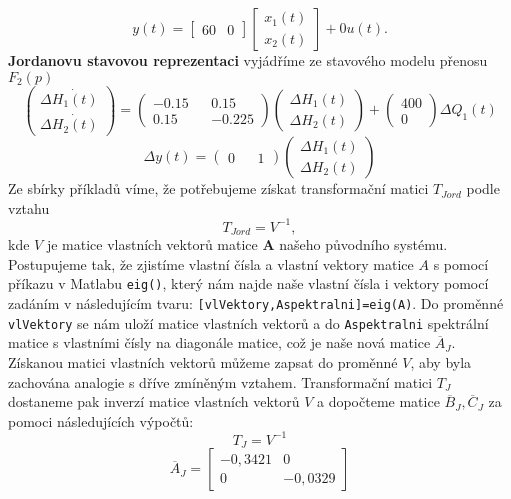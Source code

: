 \documentclass{article}
\begin{document}
				\[y(t)=\begin{bmatrix}
					60&0
				\end{bmatrix}
				\begin{bmatrix}
					x_{1}(t)\\
					x_{2}(t)
				\end{bmatrix}+0u(t).\]
			\textbf{Jordanovu stavovou reprezentaci} vyjádříme ze stavového modelu přenosu \(F_{2}(p)\)
				\[\begin{pmatrix}
					\Delta \dot{H_1(t)}\\
					\Delta \dot{H_2(t)}
				\end{pmatrix}=\begin{pmatrix}
					-0.15 && 0.15\\
					0.15&& -0.225
				\end{pmatrix}\begin{pmatrix}
					\Delta H_1(t)\\
					\Delta H_2(t)
				\end{pmatrix}+\begin{pmatrix}
					400\\
					0
				\end{pmatrix}\Delta Q_1(t)\]
				\[\Delta y(t)=\begin{pmatrix}
					0 && 1
				\end{pmatrix}\begin{pmatrix}
					\Delta H_1(t)\\
					\Delta H_2(t)
				\end{pmatrix}\]
			Ze sbírky příkladů víme, že potřebujeme získat transformační matici \(T_{Jord}\) podle vztahu 
				\[T_{Jord}=V^{-1},\]
			kde \(V\) je matice vlastních vektorů matice \(\textbf{A}\) našeho původního systému.
			Postupujeme tak, že zjistíme vlastní čísla a vlastní vektory matice \(A\) s pomocí příkazu v Matlabu \verb*|eig()|, který nám najde naše vlastní čísla i vektory pomocí zadáním v následujícím tvaru: \verb*|[vlVektory,Aspektralni]=eig(A)|. Do proměnné \verb*|vlVektory| se nám uloží matice vlastních vektorů a do \verb*|Aspektralni| spektrální matice s vlastními čísly na diagonále matice, což je naše nová matice \(\overline{A}_{J}\). Získanou matici vlastních vektorů můžeme zapsat do proměnné \(V\), aby byla zachována analogie s dříve zmíněným vztahem.
			Transformační matici \(T_{J}\) dostaneme pak inverzí matice vlastních vektorů \(V\) a dopočteme matice \(\overline{B}_{J},\overline{C}_{J}\) za pomoci následujících výpočtů:
				\[T_{J}=V^{-1}\]
				\[\overline{A}_{J}=\begin{bmatrix}
					-0,3421&0\\
					0&-0,0329
				\end{bmatrix}\]
\end{document}
